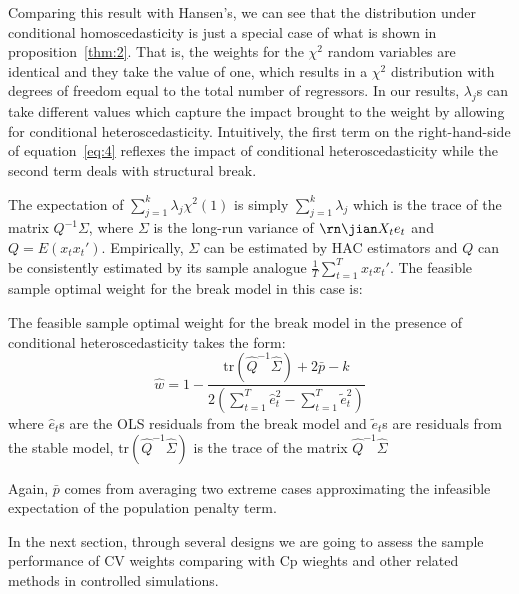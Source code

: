 Comparing this result with Hansen's, we can see that the distribution under conditional homoscedasticity is just a special case of what is shown in proposition~\ref{thm:2}. That is, the weights for the $\chi^2$ random variables are identical and they take the value of one, which results in a $\chi^2$ distribution with degrees of freedom equal to the total number of regressors. In our results, $\lambda_j$s can take different values which capture the impact brought to the weight by allowing for conditional heteroscedasticity. Intuitively, the first term on the right-hand-side of equation~\ref{eq:4} reflexes the impact of conditional heteroscedasticity while the second term deals with structural break.

The expectation of $\sum_{j=1}^{k} \lambda_j \chi^2(1)$ is simply $\sum_{j=1}^{k} \lambda_j$ which is the trace of the matrix $Q^{-1} \Sigma$, where $\Sigma$ is the long-run variance of $\rn\jian X_t e_t$ and $Q = E(x_t x_t')$. Empirically, $\Sigma$ can be estimated by HAC estimators and $Q$ can be consistently estimated by its sample analogue $\frac{1}{T}\sum_{t=1}^{T}x_t x_t'$. The feasible sample optimal weight for the break model in this case is:

\begin{corollary} \label{corollary:2}
The feasible sample optimal weight for the break model in the presence of conditional heteroscedasticity takes the form:
    \begin{equation} \label{eq:5}
    	\hat{w} = 1 - \frac{\mathrm{tr}\left(\hat{Q}^{-1}\hat{\Sigma}\right) + 2\bar{p} - k}{2\left(\sum_{t=1}^{T}\hat{e}_t^2 - \sum_{t=1}^{T}\tilde{e}_t^2\right)}
    \end{equation}
where $\hat{e}_t$s are the OLS residuals from the break model and $\tilde{e}_t$s are residuals from the stable model, $\mathrm{tr}(\hat{Q}^{-1}\hat{\Sigma})$ is the trace of the matrix $\hat{Q}^{-1}\hat{\Sigma}$
\end{corollary}

Again, $\bar{p}$ comes from averaging two extreme cases approximating the infeasible expectation of the population penalty term.

In the next section, through several designs we are going to assess the sample performance of CV weights comparing with Cp wieghts and other related methods in controlled simulations. 